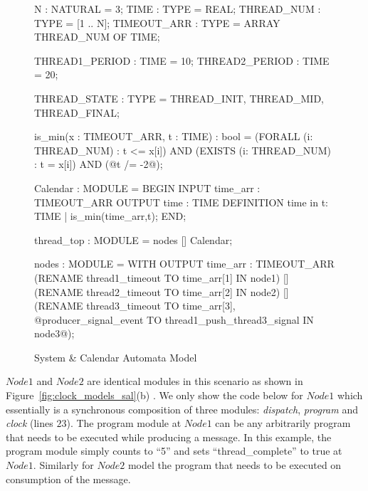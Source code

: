\begin{figure}[ht]
\centering
\begin{sal}
N : NATURAL = 3; TIME : TYPE = REAL; THREAD_NUM : TYPE = [1 .. N]; TIMEOUT_ARR :
TYPE = ARRAY THREAD_NUM OF TIME;

THREAD1_PERIOD : TIME = 10; THREAD2_PERIOD : TIME = 20;

THREAD_STATE : TYPE = {THREAD_INIT, THREAD_MID, THREAD_FINAL};

is_min(x : TIMEOUT_ARR, t : TIME) : bool = (FORALL (i: THREAD_NUM) : t <= x[i])
  AND (EXISTS (i: THREAD_NUM) : t = x[i]) AND (@t /= -2@);

Calendar : MODULE = BEGIN INPUT time_arr : TIMEOUT_ARR OUTPUT time : TIME
DEFINITION time in {t: TIME | is_min(time_arr,t)}; END;

thread_top : MODULE = nodes [] Calendar;

nodes : MODULE = WITH OUTPUT time_arr : TIMEOUT_ARR (RENAME thread1_timeout TO
  time_arr[1] IN node1) [] (RENAME thread2_timeout TO time_arr[2] IN node2) []
  (RENAME thread3_timeout TO time_arr[3], @producer_signal_event TO
  thread1_push_thread3_signal IN node3@);
\end{sal}
\caption{System \& Calendar Automata Model}
\label{fig:system-and-calendar-model}
\end{figure}

$Node1$ and $Node2$ are identical modules in this scenario as shown in
Figure~\ref{fig:clock_models_sal}(b) . We only show the code below for $Node1$
which essentially is a synchronous composition of three
modules: \emph{dispatch}, \emph{program} and \emph{clock} (lines $23$). The
program module at $Node1$ can be any arbitrarily program that needs to be
executed while producing a message. In this example, the program module simply
counts to “5” and sets “thread\_complete” to true at $Node1$. Similarly for
$Node2$ model the program that needs to be executed on consumption of the
message.


